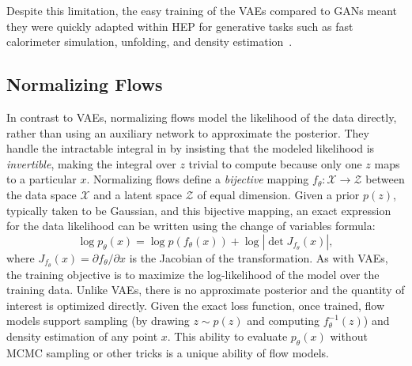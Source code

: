 Despite this limitation, the easy training of the VAEs compared to GANs meant they were quickly adapted within HEP for generative tasks such as fast calorimeter simulation, unfolding, and density estimation~\cite{Howard:2021pos,Tsan:2021brw,Cheng:2020dal}.

\subsection{Normalizing Flows}
\label{sec:flows}

In contrast to VAEs, normalizing flows model the likelihood of the data directly, rather than using an auxiliary network to approximate the posterior.
They handle the intractable integral in  by insisting that the modeled likelihood is \textit{invertible}, making the integral over $z$ trivial to compute because only one $z$ maps to a particular $x$.
Normalizing flows define a \textit{bijective} mapping $f_\theta: \mathcal{X} \to \mathcal{Z}$ between the data space $\mathcal{X}$ and a latent space $\mathcal{Z}$ of equal dimension.
Given a prior $p(z)$, typically taken to be Gaussian, and this bijective mapping, an exact expression for the data likelihood can be written using the change of variables formula:
\begin{equation}
    \log p_\theta(x) = \log p(f_\theta(x)) + \log\left|\det J_{f_\theta}(x)\right|,
    \label{eqn:flow_likelihood}
\end{equation}
where $J_{f_\theta}(x) = \partial f_\theta / \partial x$ is the Jacobian of the transformation.
As with VAEs, the training objective is to maximize the log-likelihood of the model over the training data.
Unlike VAEs, there is no approximate posterior and the quantity of interest is optimized directly.
Given the exact loss function, once trained, flow models support sampling (by drawing $z \sim p(z)$ and computing $f_\theta^{-1}(z)$) and density estimation of any point $x$.
This ability to evaluate $p_\theta(x)$ without MCMC sampling or other tricks is a unique ability of flow models.

